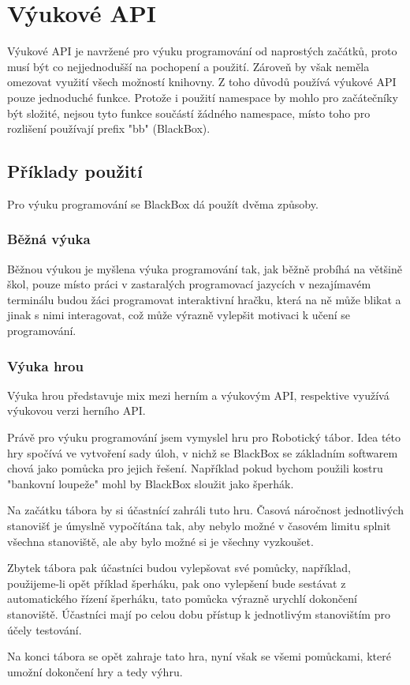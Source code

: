 \chapter{Výukové API}

Výukové API je navržené pro výuku programování od naprostých začátků, proto musí být co nejjednodušší na pochopení a použití.
Zároveň by však neměla omezovat využití všech možností knihovny.
Z toho důvodů používá výukové API pouze jednoduché funkce.
Protože i použití namespace by mohlo pro začátečníky být složité, nejsou tyto funkce součástí žádného namespace, místo toho pro rozlišení používají prefix "bb" (BlackBox).



\section{Příklady použití}

Pro výuku programování se BlackBox dá použít dvěma způsoby.

\subsection{Běžná výuka}

Běžnou výukou je myšlena výuka programování tak, jak běžně probíhá na většině škol, pouze místo práci v zastaralých programovací jazycích v nezajímavém terminálu budou žáci programovat interaktivní hračku, která na ně může blikat a jinak s nimi interagovat, což může výrazně vylepšit motivaci k učení se programování.

\subsection{Výuka hrou}

Výuka hrou představuje mix mezi herním a výukovým API, respektive využívá výukovou verzi herního API.

Právě pro výuku programování jsem vymyslel hru pro Robotický tábor.
Idea této hry spočívá ve vytvoření sady úloh, v nichž se BlackBox se základním softwarem chová jako pomůcka pro jejich řešení.
Například pokud bychom použili kostru "bankovní loupeže" mohl by BlackBox sloužit jako šperhák. %

Na začátku tábora by si účastnící zahráli tuto hru.
Časová náročnost jednotlivých stanovišť je úmyslně vypočítána tak, aby nebylo možné v časovém limitu splnit všechna stanoviště, ale aby bylo možné si je všechny vyzkoušet.

Zbytek tábora pak účastníci budou vylepšovat své pomůcky, například, použijeme-li opět příklad šperháku, pak ono vylepšení bude sestávat z automatického řízení šperháku, tato pomůcka výrazně urychlí dokončení stanoviště.
Účastníci mají po celou dobu přístup k jednotlivým stanovištím pro účely testování.

Na konci tábora se opět zahraje tato hra, nyní však se všemi pomůckami, které umožní dokončení hry a tedy výhru.
